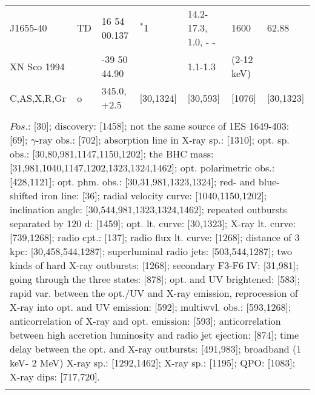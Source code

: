 \documentclass{aa}
\begin{document}
\begin{tabular}{p{2.5cm}p{1cm}p{1.8cm}p{2.3cm}p{3.3cm}p{2.0cm}p{2.2cm}}
J1655-40             & TD     & 16 54 00.137 & $^*$1             & 14.2-17.3, 1.0, - -  & 1600              & 62.88               \\
XN Sco 1994      &           & -39 50 44.90  &                        & 1.1-1.3                    & (2-12 keV)    &                         \\
C,AS,X,R,Gr       & o       & 345.0, +2.5     & [30,1324]      & [30,593]                  & [1076]           & [30,1323]   \\
\\
\multicolumn{7}{p{17.5cm}}{
$Pos$.: [30]; discovery: [1458]; not the same source of 1ES 1649-403: [69]; $\gamma$-ray obs.: [702]; absorption line 
in X-ray sp.: [1310]; opt. sp. obs.: [30,80,981,1147,1150,1202]; the BHC mass: [31,981,1040,1147,1202,1323,1324,1462]; 
opt. polarimetric obs.: [428,1121]; opt. phm. obs.: [30,31,981,1323,1324]; red- and blue-shifted iron line: [36]; radial 
velocity curve: [1040,1150,1202];  inclination angle: [30,544,981,1323,1324,1462]; repeated outbursts separated by 
120 d: [1459]; opt. lt. curve: [30,1323]; X-ray lt. curve: [739,1268]; radio cpt.: [137]; radio flux lt. curve: [1268]; distance 
of 3 kpc: [30,458,544,1287]; superluminal radio jets: [503,544,1287]; two kinds of hard X-ray outbursts: [1268]; 
secondary F3-F6 IV: [31,981]; going through the three states: [878]; opt. and UV brightened: [583]; rapid var. between 
the opt./UV and X-ray emission, reprocession of X-ray into opt. and UV emission: [592]; multiwvl. obs.: 
[593,1268]; anticorrelation of X-ray and opt. emission: [593]; anticorrelation between high accretion luminosity 
and radio jet ejection: [874]; time delay between the opt. and X-ray outbursts: [491,983]; broadband 
(1 keV- 2 MeV) X-ray sp.: [1292,1462]; X-ray sp.: [1195]; QPO: [1083]; X-ray dips: [717,720].}\\
\noalign{\smallskip}
\hline


\end{tabular}
\end{document}
